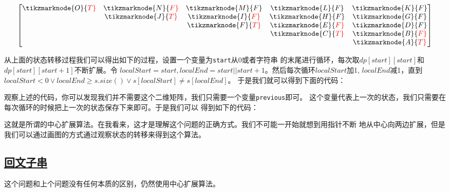 \documentclass[../../main.tex]{subfiles}
\begin{document}
$$
\begin{bmatrix}
  \tikzmarknode{O}{\color{red}T} & \tikzmarknode{N}{\color{red}F} & \tikzmarknode{M}{F} & \tikzmarknode{L}{F} & \tikzmarknode{K}{F} \\
  & \tikzmarknode{J}{\color{red}T} & \tikzmarknode{I}{\color{red}F} & \tikzmarknode{H}{F} & \tikzmarknode{G}{F} \\
  &   & \tikzmarknode{F}{\color{red}T}& \tikzmarknode{E}{\color{red}F} & \tikzmarknode{D}{F} \\
  &   &   & \tikzmarknode{C}{\color{red}T} & \tikzmarknode{B}{\color{red}F} \\
  &   &   &   & \tikzmarknode{A}{\color{red}{T}}
\end{bmatrix}
$$


从上面的状态转移过程我们可以得出如下的过程，设置一个变量为\verb|start|从0或者字符串
的末尾进行循环，每次取$dp[start][start]$和$dp[start][start + 1]$不断扩展。令
$localStart = start, localEnd = start || start + 1$。然后每次循环$localStart$加1,
$localEnd$减1，直到$localStart < 0 \lor localEnd \geq s.size() \lor s[localStart] \neq s[localEnd]$。
于是我们就可以得到下面的代码：



观察上述的代码，你可以发现我们并不需要这个二维矩阵，我们只需要一个变量\verb|previous|即可。
这个变量代表上一次的状态，我们只需要在每次循环的时候把上一次的状态保存下来即可。于是我们可以
得到如下的代码：



这就是所谓的中心扩展算法。在我看来，这才是理解这个问题的正确方式。我们不可能一开始就想到用指针不断
地从中心向两边扩展，但是我们可以通过画图的方式通过观察状态的转移来得到这个算法。

\subsection{\href{https://leetcode-cn.com/problems/palindromic-substrings/}{回文子串}}

这个问题和上个问题没有任何本质的区别，仍然使用中心扩展算法。
\end{document}
